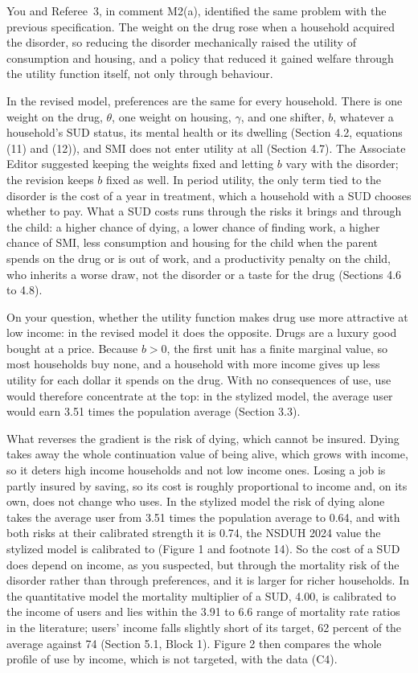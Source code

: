 \documentclass[11pt]{article}
\begin{document}
\begin{response}
\concede You and Referee~3, in comment M2(a), identified the same problem with the previous
specification. The weight on the drug rose when a household acquired the disorder, so
reducing the disorder mechanically raised the utility of consumption and housing, and a
policy that reduced it gained welfare through the utility function itself, not only through
behaviour.

In the revised model, preferences are the same for every household. There is one weight on
the drug, $\theta$, one weight on housing, $\gamma$, and one shifter, $b$, whatever a
household's SUD status, its mental health or its dwelling (Section 4.2, equations (11) and
(12)), and SMI does not enter utility at all (Section 4.7). The Associate Editor suggested
keeping the weights fixed and letting $b$ vary with the disorder; the revision keeps $b$
fixed as well. In period utility, the only term tied to the disorder is the cost of a year
in treatment, which a household with a SUD chooses whether to pay. What a SUD costs runs
through the risks it brings and through the child: a higher chance of dying, a lower chance
of finding work, a higher chance of SMI, less consumption and housing for the child when the
parent spends on the drug or is out of work, and a productivity penalty on the child, who
inherits a worse draw, not the disorder or a taste for the drug (Sections 4.6 to 4.8).

On your question, whether the utility function makes drug use more attractive at low
income: in the revised model it does the opposite. Drugs are a luxury good bought at a
price. Because $b>0$, the first unit has a finite marginal value, so most households buy
none, and a household with more income gives up less utility for each dollar it spends on
the drug. With no consequences of use, use would therefore concentrate at the top: in the
stylized model, the average user would earn 3.51 times the population average (Section
3.3).

What reverses the gradient is the risk of dying, which cannot be insured. Dying takes away
the whole continuation value of being alive, which grows with income, so it deters high
income households and not low income ones. Losing a job is partly insured by saving, so
its cost is roughly proportional to income and, on its own, does not change who uses. In
the stylized model the risk of dying alone takes the average user from 3.51 times the
population average to 0.64, and with both risks at their calibrated strength it is 0.74,
the NSDUH 2024 value the stylized model is calibrated to (Figure 1 and footnote 14). So the
cost of a SUD does depend on income, as you suspected, but through the mortality risk of
the disorder rather than through preferences, and it is larger for richer households. In
the quantitative model the mortality multiplier of a SUD, 4.00, is calibrated to the income
of users and lies within the 3.91 to 6.6 range of mortality rate ratios in the literature;
users' income falls slightly short of its target, 62 percent of the average against 74
(Section 5.1, Block 1). Figure 2 then compares the whole profile of use by income, which is
not targeted, with the data (C4).


\end{response}
\end{document}
